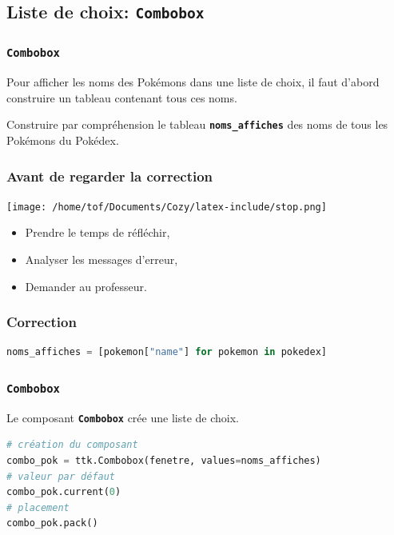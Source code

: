 \documentclass[svgnames,11pt]{beamer}
\begin{document}
\subsection{Liste de choix: \textbf{\texttt{Combobox}}}
\begin{frame}
    \frametitle{\textbf{\texttt{Combobox}}}

Pour afficher les noms des Pokémons dans une liste de choix, il faut d'abord construire un tableau contenant tous ces noms.
\begin{activite}
Construire par compréhension le tableau \textbf{\texttt{noms\_affiches}} des noms de tous les Pokémons du Pokédex.
\end{activite}

\end{frame}
\begin{frame}
    \frametitle{Avant de regarder la correction}
\begin{center}
    \centering
    \texttt{[image: /home/tof/Documents/Cozy/latex-include/stop.png]}
    \end{center}
{\Large
    \begin{itemize}
        \item Prendre le temps de réfléchir,
        \item Analyser les messages d'erreur,
        \item Demander au professeur.
    \end{itemize}
}
\end{frame}
\begin{frame}[fragile]
    \frametitle{Correction}

\begin{center}
\begin{lstlisting}[language=Python , basicstyle=\ttfamily\small, xleftmargin=.2em, xrightmargin=-3em]
noms_affiches = [pokemon["name"] for pokemon in pokedex]
\end{lstlisting}
\label{CODE}
\end{center}  

\end{frame}
\begin{frame}[fragile]
    \frametitle{\textbf{\texttt{Combobox}}}

    Le composant \textbf{\texttt{Combobox}} crée une liste de choix.
    \begin{center}
        \begin{lstlisting}[language=Python , basicstyle=\ttfamily\small, xleftmargin=.3em, xrightmargin=-2em]
# création du composant
combo_pok = ttk.Combobox(fenetre, values=noms_affiches)
# valeur par défaut
combo_pok.current(0)
# placement
combo_pok.pack()   
\end{lstlisting}
        \label{CODE}
    \end{center}

\end{frame}
\end{document}
